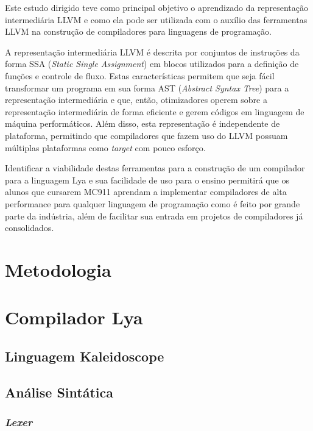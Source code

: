 \documentclass[11pt, oneside, titlepage]{report}
\begin{document}
      Este estudo dirigido teve como principal objetivo o aprendizado da representação intermediária LLVM e como ela
      pode ser utilizada com o auxílio das ferramentas LLVM na construção de compiladores para linguagens de
      programação.

      A representação intermediária LLVM é descrita por conjuntos de instruções da forma
      SSA (\textit{Static Single Assignment}) em blocos utilizados para a definição de funções e controle de fluxo.
      Estas características permitem que seja fácil transformar um programa em sua forma
      AST (\textit{Abstract Syntax Tree}) para a representação intermediária e que, então, otimizadores operem sobre a
      representação intermediária de forma eficiente e gerem códigos em linguagem de máquina performáticos.
      Além disso, esta representação é independente de plataforma, permitindo que compiladores que fazem uso do LLVM
      possuam múltiplas plataformas como \textit{target} com pouco esforço.

      Identificar a viabilidade destas ferramentas para a construção de um compilador para a linguagem Lya e sua
      facilidade de uso para o ensino permitirá que os alunos que cursarem MC911 aprendam a implementar compiladores
      de alta performance para qualquer linguagem de programação como é feito por grande parte da indústria, além de
      facilitar sua entrada em projetos de compiladores já consolidados.

    \chapter{Metodologia}

    \chapter{Compilador Lya}

      \section{Linguagem Kaleidoscope}

      \section{Análise Sintática}

        \subsection{\textit{Lexer}}
\end{document}

